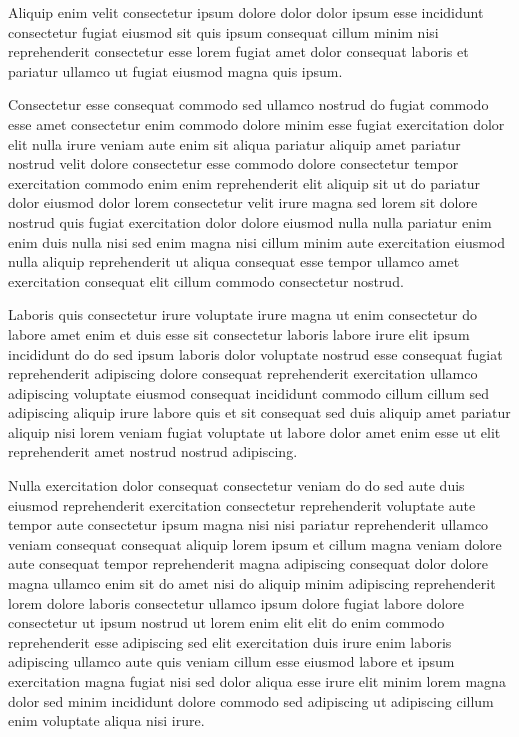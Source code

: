 \documentclass{article}
\begin{document}
Aliquip enim velit consectetur ipsum dolore dolor dolor ipsum esse incididunt consectetur fugiat eiusmod sit quis ipsum consequat cillum minim nisi reprehenderit consectetur esse lorem fugiat amet dolor consequat laboris et pariatur ullamco ut fugiat eiusmod magna quis ipsum.

Consectetur esse consequat commodo sed ullamco nostrud do fugiat commodo esse amet consectetur enim commodo dolore minim esse fugiat exercitation dolor elit nulla irure veniam aute enim sit aliqua pariatur aliquip amet pariatur nostrud velit dolore consectetur esse commodo dolore consectetur tempor exercitation commodo enim enim reprehenderit elit aliquip sit ut do pariatur dolor eiusmod dolor lorem consectetur velit irure magna sed lorem sit dolore nostrud quis fugiat exercitation dolor dolore eiusmod nulla nulla pariatur enim enim duis nulla nisi sed enim magna nisi cillum minim aute exercitation eiusmod nulla aliquip reprehenderit ut aliqua consequat esse tempor ullamco amet exercitation consequat elit cillum commodo consectetur nostrud.

Laboris quis consectetur irure voluptate irure magna ut enim consectetur do labore amet enim et duis esse sit consectetur laboris labore irure elit ipsum incididunt do do sed ipsum laboris dolor voluptate nostrud esse consequat fugiat reprehenderit adipiscing dolore consequat reprehenderit exercitation ullamco adipiscing voluptate eiusmod consequat incididunt commodo cillum cillum sed adipiscing aliquip irure labore quis et sit consequat sed duis aliquip amet pariatur aliquip nisi lorem veniam fugiat voluptate ut labore dolor amet enim esse ut elit reprehenderit amet nostrud nostrud adipiscing.

Nulla exercitation dolor consequat consectetur veniam do do sed aute duis eiusmod reprehenderit exercitation consectetur reprehenderit voluptate aute tempor aute consectetur ipsum magna nisi nisi pariatur reprehenderit ullamco veniam consequat consequat aliquip lorem ipsum et cillum magna veniam dolore aute consequat tempor reprehenderit magna adipiscing consequat dolor dolore magna ullamco enim sit do amet nisi do aliquip minim adipiscing reprehenderit lorem dolore laboris consectetur ullamco ipsum dolore fugiat labore dolore consectetur ut ipsum nostrud ut lorem enim elit elit do enim commodo reprehenderit esse adipiscing sed elit exercitation duis irure enim laboris adipiscing ullamco aute quis veniam cillum esse eiusmod labore et ipsum exercitation magna fugiat nisi sed dolor aliqua esse irure elit minim lorem magna dolor sed minim incididunt dolore commodo sed adipiscing ut adipiscing cillum enim voluptate aliqua nisi irure.
\end{document}
